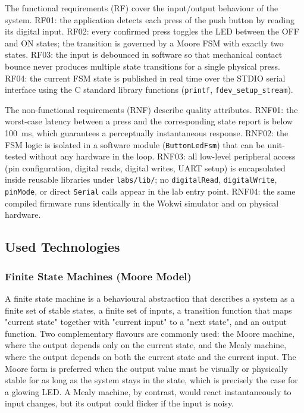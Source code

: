 The functional requirements (RF) cover the input/output behaviour of the system. RF01: the application detects each press of the push button by reading its digital input. RF02: every confirmed press toggles the LED between the OFF and ON states; the transition is governed by a Moore FSM with exactly two states. RF03: the input is debounced in software so that mechanical contact bounce never produces multiple state transitions for a single physical press. RF04: the current FSM state is published in real time over the STDIO serial interface using the C standard library functions (\texttt{printf}, \texttt{fdev\_setup\_stream}).

The non-functional requirements (RNF) describe quality attributes. RNF01: the worst-case latency between a press and the corresponding state report is below 100~ms, which guarantees a perceptually instantaneous response. RNF02: the FSM logic is isolated in a software module (\texttt{ButtonLedFsm}) that can be unit-tested without any hardware in the loop. RNF03: all low-level peripheral access (pin configuration, digital reads, digital writes, UART setup) is encapsulated inside reusable libraries under \texttt{labs/lib/}; no \texttt{digitalRead}, \texttt{digitalWrite}, \texttt{pinMode}, or direct \texttt{Serial} calls appear in the lab entry point. RNF04: the same compiled firmware runs identically in the Wokwi simulator and on physical hardware.

\subsection{Used Technologies}

\subsubsection{Finite State Machines (Moore Model)}

A finite state machine is a behavioural abstraction that describes a system as a finite set of stable states, a finite set of inputs, a transition function that maps "current state" together with "current input" to a "next state", and an output function. Two complementary flavours are commonly used: the Moore machine, where the output depends only on the current state, and the Mealy machine, where the output depends on both the current state and the current input. The Moore form is preferred when the output value must be visually or physically stable for as long as the system stays in the state, which is precisely the case for a glowing LED. A Mealy machine, by contrast, would react instantaneously to input changes, but its output could flicker if the input is noisy.

